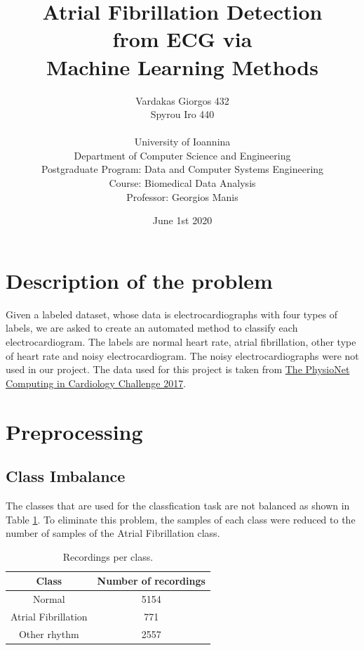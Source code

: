 \documentclass[12pt, a4paper]{article}
\title{Atrial Fibrillation Detection \\ from ECG via \\ Machine Learning Methods \\ }
\author{Vardakas Giorgos 432 \\ Spyrou Iro 440  \\ \\ University of Ioannina \\ Department of Computer Science and Engineering \\ Postgraduate Program: Data and Computer Systems Engineering \\ Course: Biomedical Data Analysis \\ Professor: Georgios Manis}
\date{June 1st 2020}
\begin{document}
\clearpage\maketitle
\thispagestyle{empty}

\newpage

\section{Description of the problem}
Given a labeled dataset, whose data is electrocardiographs with four types of labels, we are asked to create an automated method to classify each electrocardiogram. The labels are normal heart rate, atrial fibrillation, other type of heart rate and noisy electrocardiogram. The noisy electrocardiographs were not used in our project. The data used for this project is taken from  \href{https://physionet.org/content/challenge-2017/1.0.0/}{The PhysioNet Computing in Cardiology Challenge 2017}.

\section{Preprocessing}

\subsection{Class Imbalance}
The classes that are used for the classfication task are not balanced as shown in Table \hyperref[tab:Recordings per class]{1}. To eliminate this problem, the samples of each class were reduced to the number of samples of the Atrial Fibrillation class.

\begin{table}[H]
	\centering
	\begin{tabular}{ | c || c |}
		
		\hline
		\textbf{Class} & \textbf{Number of recordings} \\
		
		\hline
		Normal & 5154 \\
		
		\hline
		Atrial Fibrillation & 771\\  
		
		\hline
		Other rhythm & 2557\\
		
		\hline
	\end{tabular}
	\caption{Recordings per class.}
	\label{tab:Recordings per class}
\end{table}
\end{document}

